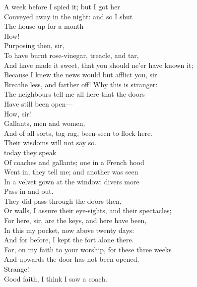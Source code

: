 \documentclass[a4paper,oneside,12pt]{memoir}
\begin{document}
\begin{drama*}
A week before I spied it; but I got her\\
Conveyed away in the night: and so I shut\\
The house up for a month---\\
\lovewitspeaks {} How!\\
\facespeaks {} Purposing then, sir,\\
To have burnt rose-vinegar, treacle, and tar,\\
And have made it sweet, that you should ne'er have known it;\\
Because I knew the news would but afflict you, sir.\\
\lovewitspeaks Breathe less, and farther off! Why this is stranger:\\
The neighbours tell me all here that the doors\\
Have still been open---\\
\facespeaks {} How, sir!\\
\lovewitspeaks {} Gallants, men and women,\\
And of all sorts, tag-rag, been seen to flock here.\\
\facespeaks Their wisdoms will not say so.\\
\lovewitspeaks {} today they speak\\
Of coaches and gallants; one in a French hood\\
Went in, they tell me; and another was seen\\
In a velvet gown at the window: divers more\\
Pass in and out.\\
\facespeaks {} They did pass through the doors then,\\
Or walls, I assure their eye-sights, and their spectacles;\\
For here, sir, are the keys, and here have been,\\
In this my pocket, now above twenty days:\\
And for before, I kept the fort alone there.\\
For, on my faith to your worship, for these three weeks\\
And upwards the door has not been opened.\\
\lovewitspeaks Strange!\\
\neighonespeaks {} Good faith, I think I saw a coach.\\

\end{drama*}
\end{document}
